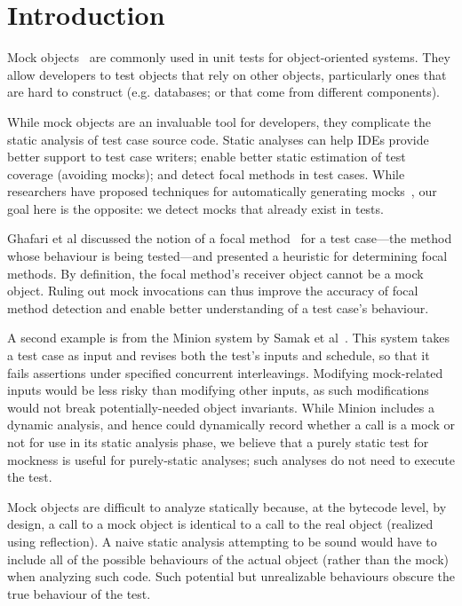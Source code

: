 \section{Introduction}
\label{sec:introduction}

Mock objects~\cite{beck02:_test_driven_devel} are commonly used in
unit tests for object-oriented systems.  They allow developers to test objects that 
rely on other objects, particularly ones that are hard 
to construct (e.g. databases; or that come from different components).

While mock objects are an invaluable tool for developers, they
complicate the static analysis of test case source code. 
Static analyses can help IDEs provide better
support to test case writers; enable better static estimation of test coverage
(avoiding mocks); and detect focal methods in test cases. While researchers have
proposed techniques for automatically generating mocks~\cite{alshahwan10:_autom,fazzini20:_framew_autom_test_mockin_mobil_apps}, our goal here is the opposite:
we detect mocks that already exist in tests.

Ghafari et al discussed the notion of a focal method~\cite{ghafari15:_autom} for a test case---the method
whose behaviour is being tested---and presented a heuristic for determining focal methods.
By definition, the focal method's receiver object cannot be a mock object.
Ruling out mock invocations can thus improve the accuracy of focal method detection and
enable better understanding of a test case's behaviour.

A second example is from the {\sc Minion} system by Samak et al~\cite{samak16:_direc_synth_failin_concur_execut}. 
This system takes a test case as input and revises both the test's inputs and schedule, so that it fails assertions under specified concurrent interleavings. Modifying mock-related inputs would be less risky than modifying other inputs, as such modifications would not break potentially-needed object invariants. While {\sc Minion} includes a dynamic analysis, and hence could dynamically record whether a call is a mock or not for use in its static analysis phase, we believe that a purely static test for mockness is useful for purely-static analyses; such analyses do not need to execute the test.

Mock objects are difficult to analyze statically because, at the bytecode level,
by design, a call to a mock object is identical to a call to the real object 
(realized using reflection).
A naive static analysis attempting to be sound would have to include all of 
the possible behaviours of the actual object (rather than the mock) when analyzing such code. 
Such potential but unrealizable behaviours obscure the true behaviour 
of the test.


